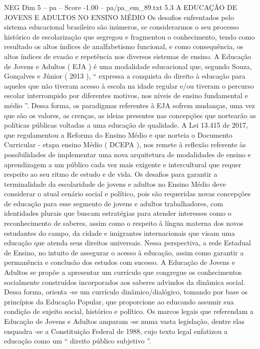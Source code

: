 \begin{textsample}{NEG Dim 5 – pa – Score -1.00 – pa/pa\_em\_89.txt}  \label{ex:f5_neg_047}
5.3 A EDUCAÇÃO DE JOVENS E ADULTOS NO ENSINO MÉDIO Os desafios enfrentados pelo sistema educacional brasileiro são inúmeros, se considerarmos o seu processo histórico de escolarização que segregou e fragmentou o conhecimento, tendo como resultado os altos índices de analfabetismo funcional, e como consequência, os altos índices de evasão e repetência nos diversos sistemas de ensino.
A Educação de Jovens e Adultos ( EJA ) é uma modalidade educacional que, segundo Souza, Gonçalves e Júnior ( 2013 ), “ expressa a conquista do direito à educação para aqueles que não tiveram acesso à escola na idade regular e/ou tiveram o percurso escolar interrompido por diferentes motivos, nos níveis de ensino fundamental e médio ”.
Dessa forma, os paradigmas referentes à EJA sofrem mudanças, uma vez que são os valores, as crenças, as ideias presentes nas concepções que nortearão as políticas públicas voltadas a uma educação de qualidade.
A Lei 13.415 de 2017, que regulamentou a Reforma do Ensino Médio e que norteia o Documento Curricular - etapa ensino Médio ( DCEPA ), nos remete à reflexão referente às possibilidades de implementar uma nova arquitetura de modalidades de ensino e aprendizagem a um público cada vez mais exigente e intercultural que requer respeito ao seu ritmo de estudo e de vida.
Os desafios para garantir a terminalidade da escolaridade de jovens e adultos no Ensino Médio deve considerar o atual cenário social e político, pois são requeridas novas concepções de educação para esse segmento de jovens e adultos trabalhadores, com identidades plurais que buscam estratégias para atender interesses como o reconhecimento de saberes, assim como o respeito à língua materna dos novos estudantes do campo, da cidade e imigrantes internacionais que visam uma educação que atenda seus direitos universais.
Nessa perspectiva, a rede Estadual de Ensino, no intuito de assegurar o acesso à educação, assim como garantir a permanência e conclusão dos estudos com sucesso.
A Educação de Jovens e Adultos se propõe a apresentar um currículo que congregue os conhecimentos socialmente construídos incorporados aos saberes advindos da dinâmica social.
Dessa forma, orienta -se um currículo dinâmico/dialógico, tomando por base os princípios da Educação Popular, que proporcione ao educando assumir sua condição de sujeito social, histórico e político.
Os marcos legais que referendam a Educação de Jovens e Adultos amparam -se numa vasta legislação, dentre elas enquadra -se a Constituição Federal de 1988, cujo texto legal enfatizou a educação como um “ direito público subjetivo ”.

\end{textsample}
